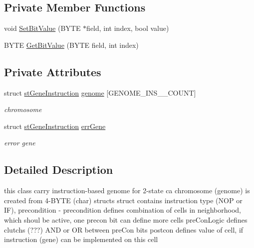\subsection*{Private Member Functions}
\begin{DoxyCompactItemize}
\item 
void \hyperlink{classCGenomeType2__Ins_a2a353438a53537345f463599284f7e9c}{SetBitValue} (BYTE $\ast$field, int index, bool value)
\item 
BYTE \hyperlink{classCGenomeType2__Ins_a1ec35ff3d5c9ff3902740d2a904c6fab}{GetBitValue} (BYTE field, int index)
\end{DoxyCompactItemize}
\subsection*{Private Attributes}
\begin{DoxyCompactItemize}
\item 
\hypertarget{classCGenomeType2__Ins_a20a94fa567ee4bbcf3b2b4160832b37f}{
struct \hyperlink{structstGeneInstruction}{stGeneInstruction} \hyperlink{classCGenomeType2__Ins_a20a94fa567ee4bbcf3b2b4160832b37f}{genome} \mbox{[}GENOME\_\-INS\_\-\_\-COUNT\mbox{]}}
\label{classCGenomeType2__Ins_a20a94fa567ee4bbcf3b2b4160832b37f}

\begin{DoxyCompactList}\small\item\em chromosome \item\end{DoxyCompactList}\item 
\hypertarget{classCGenomeType2__Ins_a131cc5e7367bead06f4367c97aba3939}{
struct \hyperlink{structstGeneInstruction}{stGeneInstruction} \hyperlink{classCGenomeType2__Ins_a131cc5e7367bead06f4367c97aba3939}{errGene}}
\label{classCGenomeType2__Ins_a131cc5e7367bead06f4367c97aba3939}

\begin{DoxyCompactList}\small\item\em error gene \item\end{DoxyCompactList}\end{DoxyCompactItemize}


\subsection{Detailed Description}
this class carry instruction-\/based genome for 2-\/state ca chromosome (genome) is created from 4-\/BYTE (char) structs struct contains instruction type (NOP or IF), precondition -\/ precondition defines combination of cells in neighborhood, which shoul be active, one precon bit can define more cells preConLogic defines clutchs (???) AND or OR between preCon bits postcon defines value of cell, if instruction (gene) can be implemented on this cell 

